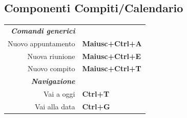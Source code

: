 \documentclass[12pt]{article}
\begin{document}
\begin{landscape}
\begin{center}
\begin{multicols}{2}
	\section*{Componenti Compiti/Calendario}
	\begin{tabular*}{4in}{rp{1.5in}}
		\textit{\textbf{Comandi generici}}	&					\\
		Nuovo appuntamento			& \textbf{Maiusc+Ctrl+A}			\\
		Nuova riunione				& \textbf{Maiusc+Ctrl+E}			\\
		\vspace{1.5mm}
		Nuovo compito				& \textbf{Maiusc+Ctrl+T}			\\
		\textit{\textbf{Navigazione}}		&					\\
		Vai a oggi				& \textbf{Ctrl+T}			\\
		Vai alla data				& \textbf{Ctrl+G}			\\
	\end{tabular*}
	\end{multicols}
	\end{center}
	\end{landscape}
 
\end{document}
